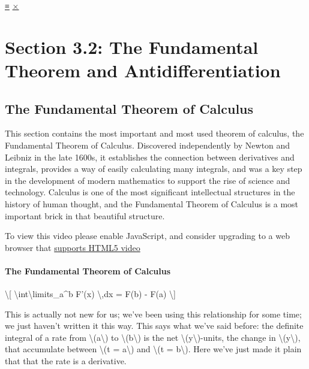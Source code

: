 \protect\hyperlink{main-nav}{≡} \protect\hyperlink{close-nav}{×}

\hypertarget{section-3.2-the-fundamental-theorem-and-antidifferentiation}{%
\section{Section 3.2: The Fundamental Theorem and
Antidifferentiation}\label{section-3.2-the-fundamental-theorem-and-antidifferentiation}}

\hypertarget{the-fundamental-theorem-of-calculus}{%
\subsection{The Fundamental Theorem of
Calculus}\label{the-fundamental-theorem-of-calculus}}

This section contains the most important and most used theorem of
calculus, the Fundamental Theorem of Calculus. Discovered independently
by Newton and Leibniz in the late 1600s, it establishes the connection
between derivatives and integrals, provides a way of easily calculating
many integrals, and was a key step in the development of modern
mathematics to support the rise of science and technology. Calculus is
one of the most significant intellectual structures in the history of
human thought, and the Fundamental Theorem of Calculus is a most
important brick in that beautiful structure.

To view this video please enable JavaScript, and consider upgrading to a
web browser that \href{http://videojs.com/html5-video-support/}{supports
HTML5 video}

\hypertarget{the-fundamental-theorem-of-calculus-1}{%
\paragraph{The Fundamental Theorem of
Calculus}\label{the-fundamental-theorem-of-calculus-1}}

\textbackslash{}{[} \textbackslash{}int\textbackslash{}limits\_a\^{}b
F'(x) \textbackslash{},dx = F(b) - F(a) \textbackslash{}{]}

This is actually not new for us; we've been using this relationship for
some time; we just haven't written it this way. This says what we've
said before: the definite integral of a rate from
\textbackslash{}(a\textbackslash{}) to
\textbackslash{}(b\textbackslash{}) is the net
\textbackslash{}(y\textbackslash{})-units, the change in
\textbackslash{}(y\textbackslash{}), that accumulate between
\textbackslash{}(t = a\textbackslash{}) and \textbackslash{}(t =
b\textbackslash{}). Here we've just made it plain that that the rate is
a derivative.

